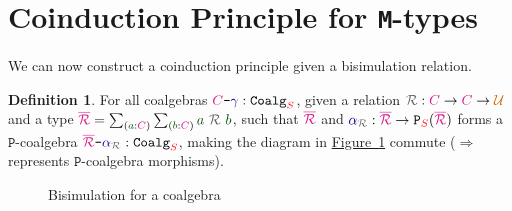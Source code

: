 \documentclass[twoside,11pt,openright]{report}
\theoremstyle{plain} %
\theoremstyle{definition}
\newtheorem{defn}[thm]{Definition}%
\theoremstyle{remark}
\newcommand*{\figref}[1]{\hyperref[fig:#1]{Figure~\ref*{fig:#1}}}
\newcommand*{\term}[1]{\textcolor{green!30!black}{#1}} %
\newcommand*{\type}[1]{\textcolor{magenta!90!black}{#1}}
\newcommand*{\container}[1]{\textcolor{red}{#1}}
\newcommand*{\universe}[1]{\textcolor{orange!80!black}{#1}}
\newcommand*{\coalg}[2]{#1\texttt{-}#2}
\newcommand*{\relation}[1]{\textcolor{gray!75!black}{\ensuremath{\mathtt{#1}}}}
\newcommand*{\function}[1]{\textcolor{blue!60!black}{\ensuremath{\mathtt{#1}}}}
\newcommand*{\typeformer}[1]{\ensuremath{\mathtt{#1}}}
\newcommand*{\functor}[1]{\ensuremath{\mathbf{\mathtt{#1}}}}
\begin{document}
\section{Coinduction Principle for \texttt{M}-types}
We can now construct a coinduction principle given a bisimulation relation.
\begin{defn}
  For all coalgebras \(\coalg{\type{C}}{\function{\gamma}} : \typeformer{Coalg}_{\container{S}}\), given a relation \(\relation{\mathcal{R}} : \type{C} \rightarrow \type{C} \rightarrow \universe{\mathcal{U}}\) and a type \(\type{\overline{\mathcal{R}}} = \sum_{(\term{a} : \type{C})} \sum_{(\term{b} : \type{C})} \term{a}~\relation{\mathcal{R}}~\term{b}\), such that \(\type{\overline{\mathcal{R}}}\) and \(\function{\alpha}_{\relation{\mathcal{R}}} : \type{\overline{\mathcal{R}}} \rightarrow \functor{P}_{\container{S}}(\type{\overline{\mathcal{R}}})\) forms a \(\functor{P}\)-coalgebra \(\coalg{\type{\overline{\mathcal{R}}}}{\function{\alpha}_{\relation{\mathcal{R}}}} : \mathtt{Coalg}_{\container{S}}\), making the diagram in \figref{coalgebra-coinduction-definition} commute  (\(\Longrightarrow\) represents \(\functor{P}\)-coalgebra morphisms).
  \begin{figure}[h]
    \centering
    \caption{Bisimulation for a coalgebra}
    \label{fig:coalgebra-coinduction-definition}
  \end{figure}
\end{defn}
\end{document}
